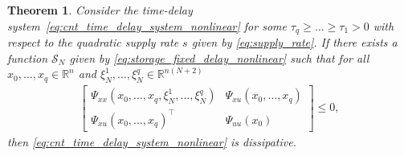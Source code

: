 \documentclass[12pt]{article}
\newtheorem{theorem}{Theorem}
\begin{document}
\begin{theorem}\rm
\label{thm:delay_dissipative}
Consider the time-delay system~\eqref{eq:cnt_time_delay_system_nonlinear} for some  $\tau_q\geq \ldots \geq \tau_1 > 0$ with respect to the quadratic supply rate $s$ given by \eqref{eq:supply_rate}. If there exists a function $\mathcal{S}_{N}$ given by \eqref{eq:storage_fixed_delay_nonlinear} such that for all $x_0,\ldots,x_q\in\mathbb{R}^n$ and $\xi^1_N,\ldots,\xi^q_N\in \mathbb{R}^{n(N+2)}$ 
\begin{align}
    \label{eq:nonlinear_LMI1}
    \begin{bmatrix}
    \Psi_{xx}(x_0,\ldots,x_q,\xi^1_N,\ldots,\xi^q_N) & \Psi_{xu}(x_0,\ldots,x_q)\\ \Psi_{xu}(x_0,\ldots,x_q)^\top & \Psi_{uu}(x_0)
\end{bmatrix}\leq 0,
\end{align}
then \eqref{eq:cnt_time_delay_system_nonlinear} is dissipative.
\end{theorem}
\end{document}
